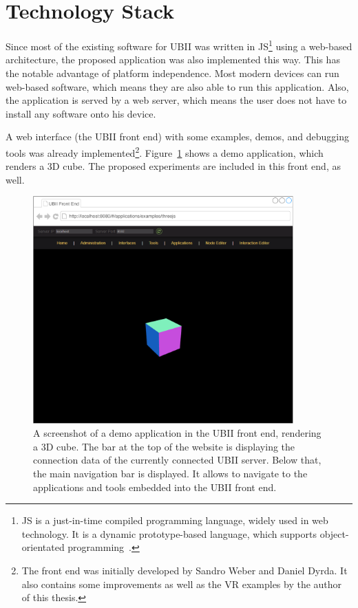 \section{Technology Stack}\label{section:technology-stack}

Since most of the existing software for \gls{UBII} was written in \gls{JS}\footnote{\gls{JS} is a just-in-time compiled programming language, widely used in web technology. It is a dynamic prototype-based language, which supports object-orientated programming~\cite[43, 47]{ECMAInternational.2018}.} using a web-based architecture, the proposed application was also implemented this way. This has the notable advantage of platform independence. Most modern devices can run web-based software, which means they are also able to run this application. Also, the application is served by a web server, which means the user does not have to install any software onto his device.

A web interface (the \gls{UBII} front end) with some examples, demos, and debugging tools was already implemented\footnote{The front end was initially developed by Sandro Weber and Daniel Dyrda. It also contains some improvements as well as the \gls{VR} examples by the author of this thesis.}. Figure~\ref{fig:ubii-front-end} shows a demo application, which renders a \gls{3D} cube. The proposed experiments are included in this front end, as well.

\begin{figure}[H]
	\centering
	\includegraphics[width=10cm]{figures/implementation/ubii_front_end.pdf}
	\caption[Screenshot of the front end]{A screenshot of a demo application in the UBII front end, rendering a \gls{3D} cube. The bar at the top of the website is displaying the connection data of the currently connected \gls{UBII} server. Below that, the main navigation bar is displayed. It allows to navigate to the applications and tools embedded into the \gls{UBII} front end.}\label{fig:ubii-front-end}
\end{figure}

